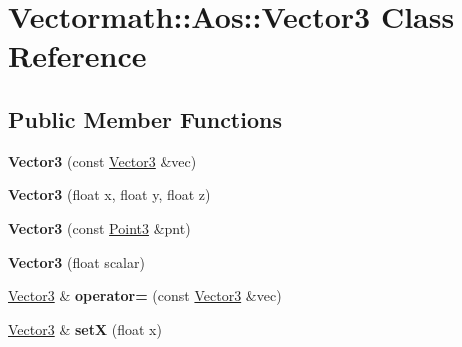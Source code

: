 \hypertarget{classVectormath_1_1Aos_1_1Vector3}{}\section{Vectormath\+:\+:Aos\+:\+:Vector3 Class Reference}
\label{classVectormath_1_1Aos_1_1Vector3}
\subsection*{Public Member Functions}
\begin{DoxyCompactItemize}
\item 
\mbox{\label{classVectormath_1_1Aos_1_1Vector3_ac61c5909c53f4daf35a4950a94de9b1d}} 
{\bfseries Vector3} (const \hyperlink{classVectormath_1_1Aos_1_1Vector3}{Vector3} \&vec)
\item 
\mbox{\label{classVectormath_1_1Aos_1_1Vector3_a0cded5830f3b42d3983f187fb2716f4f}} 
{\bfseries Vector3} (float x, float y, float z)
\item 
\mbox{\label{classVectormath_1_1Aos_1_1Vector3_a5c4725284242af1e99b5ab244c03ad2e}} 
{\bfseries Vector3} (const \hyperlink{classVectormath_1_1Aos_1_1Point3}{Point3} \&pnt)
\item 
\mbox{\label{classVectormath_1_1Aos_1_1Vector3_aa64785a6836fa840d949fecd6d419721}} 
{\bfseries Vector3} (float scalar)
\item 
\mbox{\label{classVectormath_1_1Aos_1_1Vector3_a01b5bd9dda1570098fed4ac8567710f2}} 
\hyperlink{classVectormath_1_1Aos_1_1Vector3}{Vector3} \& {\bfseries operator=} (const \hyperlink{classVectormath_1_1Aos_1_1Vector3}{Vector3} \&vec)
\item 
\mbox{\label{classVectormath_1_1Aos_1_1Vector3_acd3df8665279eab78736f9b21ea26806}} 
\hyperlink{classVectormath_1_1Aos_1_1Vector3}{Vector3} \& {\bfseries setX} (float x)
\item 
\mbox{\label{classVectormath_1_1Aos_1_1Vector3_a81e03956e22fed140468363768c78ea4}} 

\end{DoxyCompactItemize}
